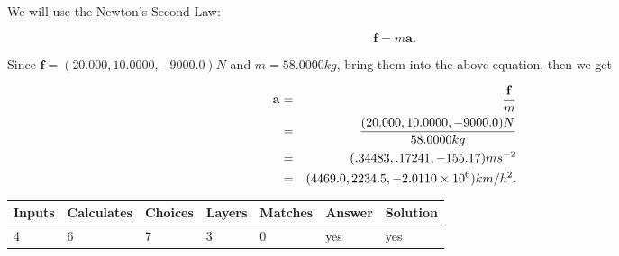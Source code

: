 \documentclass[12pt]{article}
\begin{document}
 
\noindent{}
 
 
 
 
 
 
\noindent{}
 
 

We will use the Newton's Second Law:
 
\[
\mathbf{f}=m\mathbf{a}.
\]
 
Since $\mathbf{f}=( %
20.000,  %
10.0000,  %
-9000.0 )N$
and $m= %
58.0000kg$, bring them into the above equation, then we get
 
\begin{eqnarray*}
\mathbf{a}&=&\frac{\mathbf{f}}m  \\
&=&\frac{(
20.000 ,
10.0000 ,
-9000.0 )N
}{ %
58.0000 kg}  \\
&=&(
.34483 ,
.17241,
-155.17
)ms^{-2} \\
&=&(
4469.0 ,
2234.5 ,
-2.0110 \times 10^{6}
)km/h^2.
\end{eqnarray*}
 
 
 
\noindent{}
 
 

 
\vspace{0.3in}
   
   
   
   
\noindent\begin{tabular}{|l|l|l|l|l|l|l|}
 \hline
Inputs & Calculates & Choices & Layers & Matches & Answer & Solution \\ \hline
           4 & 
           6 & 
           7
  & 
           3 & 
           0 & 
  yes & 
  yes 
  \\ \hline
 \end{tabular}
   
   
   
   
\noindent{}
   
   
  
\end{document}
